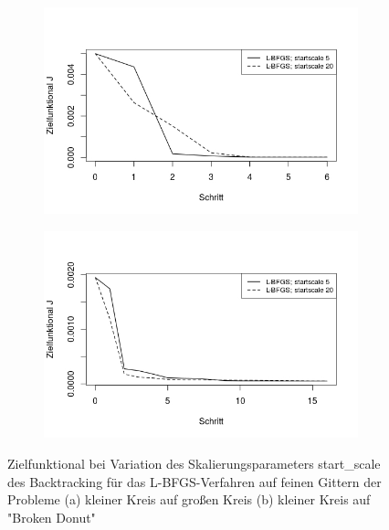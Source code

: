 \begin{figure}
	\begin{subfigure}{0.5\textwidth}
	\centering
	\includegraphics[scale=0.48]{plot_circle_bfgs_fine_startscale.jpeg}
	\caption{}	
	\end{subfigure}
	\begin{subfigure}{0.5\textwidth}
	\centering
	\includegraphics[scale=0.48]{plot_donut_bfgs_fine_startscale.jpeg}
	\caption{}	
	\end{subfigure}
\caption{Zielfunktional bei Variation des Skalierungsparameters \textsf{start\_scale} des Backtracking für das L-BFGS-Verfahren auf feinen Gittern der Probleme
 (a) kleiner Kreis auf großen Kreis (b) kleiner Kreis auf "Broken  Donut"}
\label{plot_startscales}
\end{figure}

